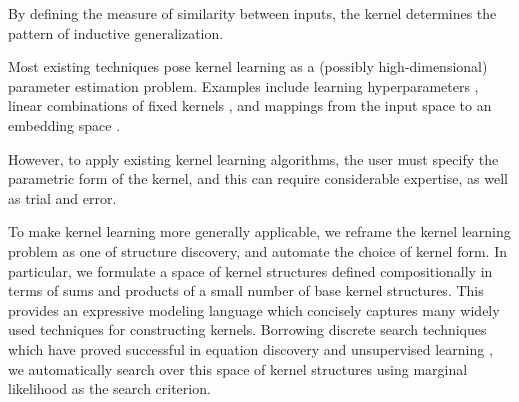 


By defining the measure of similarity between inputs, the kernel determines the pattern of inductive generalization.

Most existing techniques pose kernel learning as a (possibly high-dimensional) parameter estimation problem.
Examples include learning hyperparameters \citep{rasmussen38gaussian}, linear combinations of fixed kernels \cite{Bach_HKL}, and mappings from the input space to an embedding space \cite{salakhutdinov2008using}.

However, to apply existing kernel learning algorithms, the user must specify the parametric form of the kernel, and this can require considerable expertise, as well as trial and error.

To make kernel learning more generally applicable, we reframe the kernel learning problem as one of structure discovery, and automate the choice of kernel form.
In particular, we formulate a space of kernel structures defined compositionally in terms of sums and products of a small number of base kernel structures.
This provides an expressive modeling language which concisely captures many widely used techniques for constructing kernels.
Borrowing discrete search techniques which have proved successful in equation discovery \cite{todorovski1997declarative} and unsupervised learning \cite{grosse2012exploiting}, we automatically search over this space of kernel structures using marginal likelihood as the search criterion.

